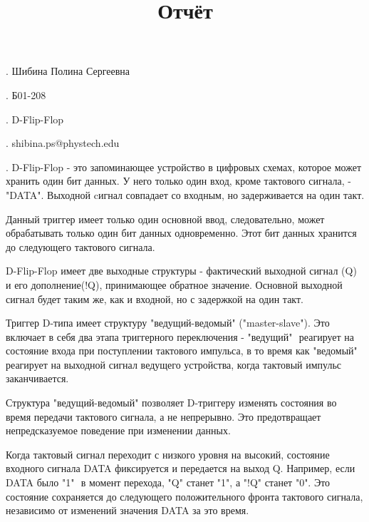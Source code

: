 \documentclass[a4paper,12pt]{article}
\title{
\begin{centering}
Отчёт
\end{centering}
}
\begin{document}
	\maketitle

. Шибина Полина Сергеевна

. Б01-208

. D-Flip-Flop

. shibina.ps@phystech.edu

. D-Flip-Flop - это запоминающее устройство в цифровых схемах, которое может хранить один бит данных. У него только один вход, кроме тактового сигнала, - "DATA". Выходной cигнал совпадает со входным, но задерживается на один такт.

\newline
Данный триггер имеет только один основной ввод, следовательно, может обрабатывать только один бит данных одновременно. Этот бит данных хранится до следующего тактового сигнала.

\newline
D-Flip-Flop имеет две выходные структуры - фактический выходной сигнал (Q) и его дополнение(!Q), принимающее обратное значение. Основной выходной сигнал будет таким же, как и входной, но с задержкой на один такт.

\newline
Триггер D-типа имеет структуру "ведущий-ведомый" ("master-slave"). Это включает в себя два этапа триггерного переключения - "ведущий" $ $ реагирует на состояние входа при поступлении тактового импульса, в то время как "ведомый" $ $ реагирует на выходной сигнал ведущего устройства, когда тактовый импульс заканчивается.

\newline
Структура "ведущий-ведомый" позволяет D-триггеру изменять состояния во время передачи тактового сигнала, а не непрерывно. Это предотвращает непредсказуемое поведение при изменении данных.

\newline
Когда тактовый сигнал переходит с низкого уровня на высокий, состояние входного сигнала DATA фиксируется и передается на выход Q. Например, если DATA было "1" $ $ в момент перехода, "Q"$ $ станет "1"$ $, а "!Q"$ $ станет "0". Это состояние сохраняется до следующего положительного фронта тактового сигнала, независимо от изменений значения DATA за это время.
\end{document}
